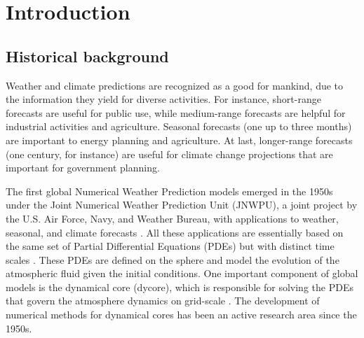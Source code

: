 

\chapter{Introduction}
\label{cap:introduction}

\enlargethispage{.5\baselineskip}

\section{Historical background}

Weather and climate predictions are recognized as a good for mankind,
due to the information they yield for diverse activities. 
For instance, short-range forecasts are useful for public use, while
medium-range forecasts are helpful for industrial activities and agriculture. 
Seasonal forecasts (one up to three months) are important to energy planning and agriculture.
At last, longer-range forecasts (one century, for instance) are useful for climate change 
projections that are important for government planning.

The first global Numerical Weather Prediction models emerged in the 1950s under the Joint Numerical Weather Prediction Unit (JNWPU), 
a joint project by the U.S. Air Force, Navy, and Weather Bureau, with applications to weather, seasonal, and climate forecasts \citep{harper:2007}.
All these applications are essentially based on the same set of Partial Differential Equations
(PDEs) but with distinct time scales \citep{stan:2008}. These PDEs are defined on the sphere
and model the evolution of the atmospheric fluid given the initial conditions.
One important component of global models is the dynamical core (dycore), which is responsible
for solving the PDEs that govern the atmosphere dynamics on grid-scale \citep{will:2007}. 
The development of numerical methods for dynamical cores has been an active research area since the {1950s}.

